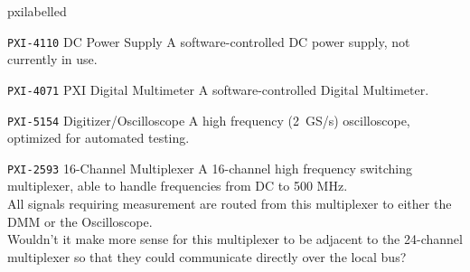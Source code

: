 \begin{labelled}{pxilabelled}
  \item[\pxislotn{4} \texttt{PXI-4110}\hspace{.25em} DC Power Supply]
    A software-controlled DC power supply, not currently in use.

  \item[\pxislotn{5} \texttt{PXI-4071}\hspace{.25em} PXI Digital Multimeter]
    A software-controlled Digital Multimeter.  

  \item[\pxislotn{6} \texttt{PXI-5154}\hspace{.25em} Digitizer/Oscilloscope]
    A high frequency (2~GS/s) oscilloscope, optimized for automated testing.

  \item[\pxislotn{7} \texttt{PXI-2593}\hspace{.25em} 16-Channel Multiplexer]
    A 16-channel high frequency switching multiplexer, able to handle frequencies from DC to 500 MHz.\\\noindent
    \FIXME All signals requiring measurement are routed from this multiplexer to either the DMM or the Oscilloscope.\\\noindent
    \FIXME Wouldn't it make more sense for this multiplexer to be adjacent to the 24-channel multiplexer so that they could communicate directly over the local bus?

\end{labelled}






